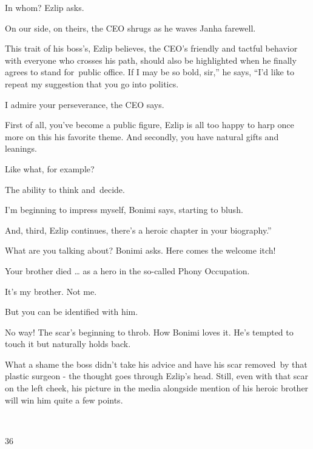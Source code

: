 \documentclass[letterpaper]{article}
\begin{document}
{\textquotedbl}In whom?{\textquotedbl} Ezlip asks. 

{\textquotedbl}On our side, on theirs,{\textquotedbl} the CEO shrugs as he waves Janha farewell.

This trait of his boss's, Ezlip believes,\textcolor[rgb]{0.0,0.4392157,0.7529412}{ }the CEO's friendly and tactful
behavior with everyone who crosses his path, should also be highlighted when he finally agrees to stand for~public
office. {\textquotedbl}If I may be so bold, sir,'' he says, ``I'd like to repeat my suggestion that you go into
politics.{\textquotedbl} 

{\textquotedbl}I admire your perseverance,{\textquotedbl} the CEO says. 

{\textquotedbl}First of all, you've become a public figure,{\textquotedbl} Ezlip is all too happy to harp once more on
this his favorite theme. {\textquotedbl}And secondly, you have natural gifts and leanings.{\textquotedbl} 

{\textquotedbl}Like what, for example?{\textquotedbl} 

{\textquotedbl}The ability to think and~decide.{\textquotedbl} 

{\textquotedbl}I'm beginning to impress myself,{\textquotedbl} Bonimi says, {\textquotedbl}starting to
blush.{\textquotedbl} 

{\textquotedbl}And, third,{\textquotedbl} Ezlip continues, {\textquotedbl}there's a heroic chapter in your biography.''

{\textquotedbl}What are you talking about?{\textquotedbl} Bonimi asks. Here comes the welcome itch!~

{\textquotedbl}Your brother died {\dots} as a hero in the so-called Phony Occupation.{\textquotedbl} 

{\textquotedbl}It's my brother. Not me.{\textquotedbl} 

{\textquotedbl}But you can be identified with him.{\textquotedbl} 

{\textquotedbl}No way!{\textquotedbl} The scar's beginning to throb. How Bonimi loves it. He's tempted to touch it but
naturally holds back. 

What a shame the boss didn't take his advice and have his scar removed~by that plastic surgeon - the thought goes
through Ezlip's head. Still, even with that scar on the left cheek, his picture in the media alongside mention of his
heroic brother will win him quite a few points.

~

36 
\end{document}
